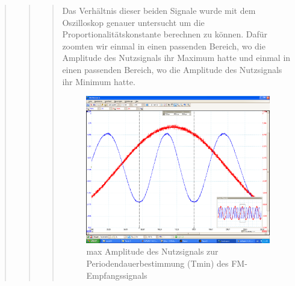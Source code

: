 \begin{quote}
\begin{quote}
\begin{quote}
        Das Verhältnis dieser beiden Signale wurde mit dem Oszilloskop genauer
        untersucht um die Proportionalitätskonstante berechnen zu können. Dafür
        zoomten wir einmal in einen passenden Bereich, wo die Amplitude des
        Nutzsignals ihr Maximum hatte und einmal in einen passenden Bereich, wo die
        Amplitude des Nutzsignals ihr Minimum hatte.
        
                    \begin{figure}[H]
                        \label{fig:}                    
                        \includegraphics[scale=0.2, trim = 0cm 1.5cm 0cm
                        2.5cm, clip]{./Bilder/aufgabe_4_12_sinus_high-ampl}
                        \caption{max Amplitude des Nutzsignals zur
                        Periodendauerbestimmung (Tmin) des FM-Empfangssignals}
                    \end{figure}


\end{quote}
\end{quote}
\end{quote}
